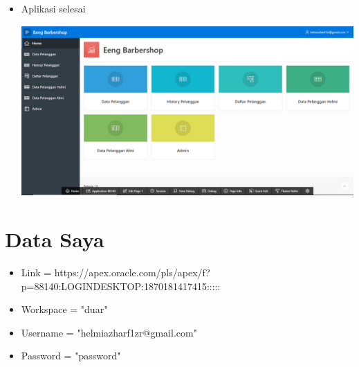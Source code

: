 ﻿\documentclass{article}
\begin{document}
\begin{itemize}
        \item Aplikasi selesai
        \begin{center}
            \centering
            \includegraphics[scale=0.3]{gambar/21.PNG}
        \end{center}

\end{itemize}
    
\section{Data Saya}
\begin{itemize}
    \item Link      = https://apex.oracle.com/pls/apex/f?p=88140:LOGIN\textunderscore DESKTOP:1870181417415:::::
    \item Workspace = "duar"
    \item Username  = "helmiazharf1zr@gmail.com"
    \item Password  = "password"
\end{itemize}

    
\end{document}
